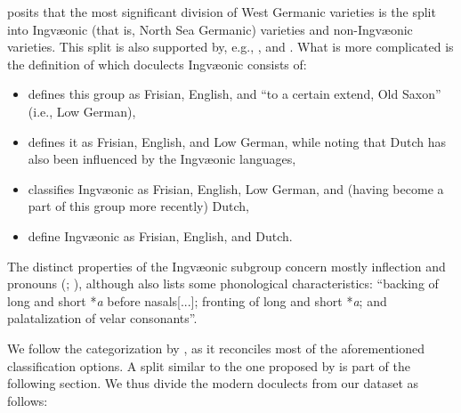 \documentclass[a4paper]{article}
\begin{document}
\citet{stiles2013pan-west} posits that
the most significant division of West Germanic varieties is
the split into Ingv\ae{}onic (that is, North Sea Germanic) varieties
and non-Ingv\ae{}onic varieties.
This split is also supported by, e.g., \citet[p. 7]{harbert2007germanic}, \citet[pp. 117--123]{sonderegger1979grundzuege} and \cite{auwera2017germanic}.
What is more complicated is the definition of which doculects Ingv\ae{}onic consists of:
\begin{itemize}
\item 
\citet{stiles2013pan-west} defines this group
as Frisian, English, and ``to a certain extend, Old Saxon'' (i.e., Low German),

\item
\citet[pp. 7--8, 17]{harbert2007germanic} defines it
as Frisian, English, and Low German,
while noting that Dutch has also been influenced by the Ingv\ae{}onic languages,

\item
\citet[pp. 71, 117--123]{sonderegger1979grundzuege} classifies Ingv\ae{}onic
as Frisian, English, Low German, and (having become a part of this group more recently) Dutch, %

\item
{} define Ingv\ae{}onic as Frisian, English, and Dutch.
\end{itemize}

The distinct properties of the Ingv\ae{}onic subgroup
concern mostly inflection and pronouns
(\citet{stiles2013pan-west}; \citet[pp. 7-8]{harbert2007germanic}),
although \citet{stiles2013pan-west} also lists some phonological characteristics:
``backing of long and short *\textit{a} before nasals[...];
fronting of long and short *\textit{a};
and palatalization of velar consonants''.

We follow the categorization by \citet{harbert2007germanic}, 
as it reconciles most of the aforementioned classification options.
A split similar to the one proposed by \citet{sonderegger1979grundzuege}
is part of the following section.
We thus divide the modern doculects from our dataset as follows:
\end{document}
